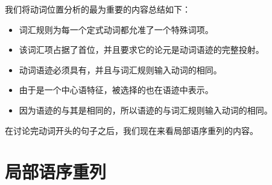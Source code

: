 我们将动词位置分析的最为重要的内容总结如下：
\begin{itemize}
\item 词汇规则为每一个定式动词都允准了一个特殊词项。
\item 该词汇项占据了首位，并且要求它的论元是动词语迹的完整投射。
\item 动词语迹必须具有\dslvc，并且\dslvc 与词汇规则输入动词的\localvc 相同。
\item 由于\dslc 是一个中心语特征，被选择的\dslvc 也在语迹中表示。
\item 因为语迹的\dslvc 与其\localvc 是相同的，所以语迹的\localvc 与词汇规则输入动词的\localvc 相同。
\end{itemize}

\noindent
在讨论完动词开头的句子之后，我们现在来看局部语序重列的内容。

\section{局部语序重列}
\label{sec-HPSG-lokale-Umstellung}
\label{Abschnitt-HPSG-lokale-Umstellung}

